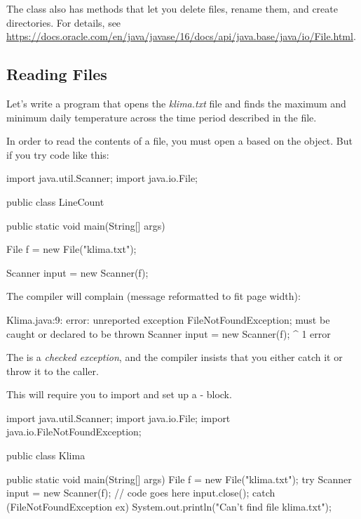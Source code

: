 The  class also has methods that let you delete files, rename them, and create directories. For details, see \url{https://docs.oracle.com/en/java/javase/16/docs/api/java.base/java/io/File.html}.

\subsection{Reading Files}

Let's write a program that opens the {\em klima.txt} file and finds the maximum and minimum daily temperature across the time period described in the file.

In order to read the contents of a file, you must open a  based on the  object. But if you try code like this:

\begin{code}
import java.util.Scanner;
import java.io.File;

public class LineCount {

    public static void main(String[] args) {        
        File f = new File("klima.txt");
        
        Scanner input = new Scanner(f);
    }
}
\end{code}

The compiler will complain (message reformatted to fit page width):

\begin{stdout}
Klima.java:9: error: unreported exception
FileNotFoundException; must be caught or declared to be thrown
        Scanner input = new Scanner(f);
                        ^
1 error
\end{stdout}

The  is a {\em checked exception}, and the compiler insists that you either catch it or throw it to the caller\footnotemark.


This will require you to import  and set up a - block. 

\begin{code}
import java.util.Scanner;
import java.io.File;
import java.io.FileNotFoundException;

public class Klima {

    public static void main(String[] args) {        
        File f = new File("klima.txt");
        try {
            Scanner input = new Scanner(f);
            // code goes here
            input.close();
        }
        catch (FileNotFoundException ex) {
            System.out.println("Can't find file klima.txt");
        }
    }
}
\end{code}

